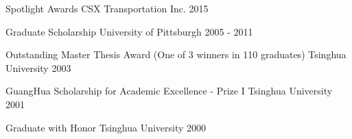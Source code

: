 
\begin{cvhonors}

\cvhonor
{} %
{Spotlight Awards} %
{CSX Transportation Inc.} %
{2015} %


\cvhonor
{} %
{Graduate Scholarship} %
{University of Pittsburgh} %
{2005 - 2011} %

\cvhonor
{} %
{Outstanding Master Thesis Award (One of 3 winners in 110 graduates)} %
{Tsinghua University} %
{2003} %


\cvhonor
{} %
{GuangHua Scholarship for Academic Excellence - Prize I} %
{Tsinghua University} %
{2001} %


\cvhonor
{} %
{Graduate with Honor} %
{Tsinghua University} %
{2000} %


\end{cvhonors}




